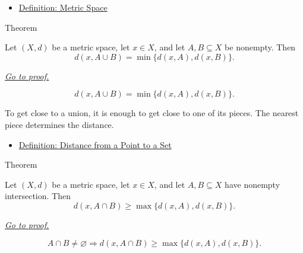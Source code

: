 \begin{dependencies}
\begin{itemize}
  \item \hyperref[def:metric-space]{Definition: Metric Space}
\end{itemize}
\end{dependencies}

\begin{theorembox}{Theorem}
\begin{theorem}\label{thm:metric-distance-to-union}
Let \((X,d)\) be a metric space, let \(x\in X\), and let \(A,B\subseteq X\)
be nonempty.  Then
\[
  d(x,A\cup B)=\min\{d(x,A),d(x,B)\}.
\]

\smallskip
\noindent
\hyperref[prf:metric-distance-to-union]{\textit{Go to proof.}}
\end{theorem}
\end{theorembox}

\begin{remark*}
\[
d(x,A\cup B)=\min\{d(x,A),d(x,B)\}.
\]
\end{remark*}

\begin{remark*}[Interpretation]
To get close to a union, it is enough to get close to one of its pieces.  The
nearest piece determines the distance.
\end{remark*}

\begin{dependencies}
\begin{itemize}
  \item \hyperref[def:metric-point-set-distance]{Definition: Distance from a Point to a Set}
\end{itemize}
\end{dependencies}

\begin{theorembox}{Theorem}
\begin{theorem}
\label{thm:metric-distance-to-intersection-bound}
Let \((X,d)\) be a metric space, let \(x\in X\), and let
\(A,B\subseteq X\) have nonempty intersection.  Then
\[
  d(x,A\cap B)\geq \max\{d(x,A),d(x,B)\}.
\]

\smallskip
\noindent
\hyperref[prf:metric-distance-to-intersection-bound]{\textit{Go to proof.}}
\end{theorem}
\end{theorembox}

\begin{remark*}
\[
A\cap B\neq\varnothing
\Longrightarrow
d(x,A\cap B)\geq \max\{d(x,A),d(x,B)\}.
\]
\end{remark*}

